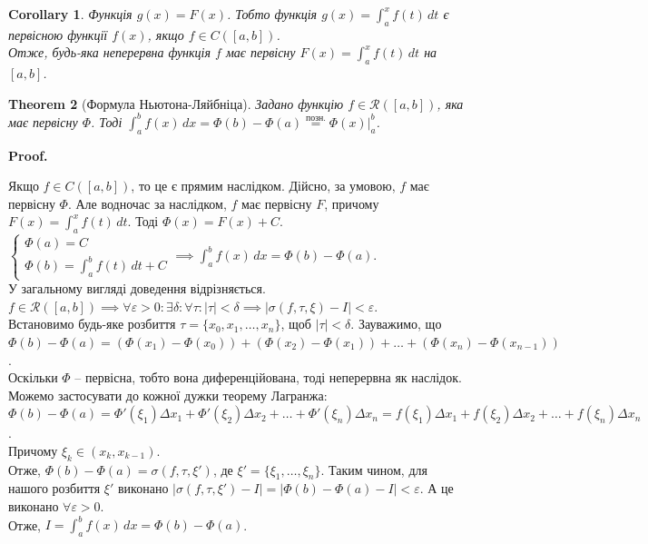 \documentclass[a4paper, 10pt]{article}
\makeatletter
\def\huge{\displaystyle}
\theoremstyle{theoremdd}
\newtheorem{theorem}{Theorem}[subsection]
\theoremstyle{theoremdd}
\theoremstyle{theoremdd}
\theoremstyle{theoremdd}
\theoremstyle{theoremdd}
\theoremstyle{theoremdd}
\theoremstyle{theoremdd}
\theoremstyle{theoremdd}
\theoremstyle{theoremdd}
\newtheorem{corollary}[theorem]{Corollary}
\renewenvironment{proof}[1][Proof.\\]{\par
\pushQED{\hfill \qed}%
\normalfont \topsep6\p@\@plus6\p@\relax
\trivlist
\item\relax
{\bfseries
#1\@addpunct{.}}\hspace\labelsep\ignorespaces
}{%
\popQED\endtrivlist\@endpefalse
}
\makeatother
\begin{document}
\begin{corollary}
Функція $g(x) = F(x)$. Тобто функція $g(x) = \huge\int_a^x f(t)\,dt$ є первісною функції $f(x)$, якщо $f \in C([a,b])$.\\
Отже, будь-яка неперервна функція $f$ має первісну $F(x) = \huge\int_a^x f(t)\,dt$ на $[a,b]$.
\end{corollary}

\begin{theorem}[Формула Ньютона-Ляйбніца]
Задано функцію $f \in \mathcal{R}([a,b])$, яка має первісну $\Phi$. Тоді $\huge\int_a^b f(x)\,dx = \Phi(b) - \Phi(a) \overset{\text{позн.}}{=} \Phi(x)\Big|_a^b$.
\end{theorem}

\begin{proof}
Якщо $f \in C([a,b])$, то це є прямим наслідком. Дійсно, за умовою, $f$ має первісну $\Phi$. Але водночас за наслідком, $f$ має первісну $F$, причому $F(x) = \huge\int_a^x f(t)\,dt$. Тоді $\Phi(x) = F(x) + C$.\\
$\begin{cases}
\Phi(a) = C \\
\Phi(b) = \huge\int_a^b f(t)\,dt + C
\end{cases} \implies \huge\int_a^b f(x)\,dx = \Phi(b) - \Phi(a)$.
\bigskip \\
У загальному вигляді доведення відрізняється. \\
$f \in \mathcal{R}([a,b]) \implies \forall \varepsilon > 0: \exists \delta: \forall \tau: |\tau| < \delta \implies |\sigma(f, \tau, \xi)-I|<\varepsilon$.\\
Встановимо будь-яке розбиття $\tau = \{x_0,x_1,\dots,x_n\}$, щоб $|\tau| < \delta$. Зауважимо, що\\
$\Phi(b) - \Phi(a) = (\Phi(x_1)-\Phi(x_0)) + (\Phi(x_2)-\Phi(x_1)) + \dots + (\Phi(x_n)-\Phi(x_{n-1}))$.\\
Оскільки $\Phi$ -- первісна, тобто вона диференційована, тоді неперервна як наслідок. Можемо застосувати до кожної дужки теорему Лагранжа:\\
$\Phi(b) - \Phi(a) = \Phi'(\xi_1) \Delta x_1 + \Phi'(\xi_2) \Delta x_2 + \dots + \Phi'(\xi_n)\Delta x_n = f(\xi_1)\Delta x_1 + f(\xi_2)\Delta x_2 + \dots + f(\xi_n)\Delta x_n$.\\
Причому $\xi_k \in (x_k,x_{k-1})$.\\
Отже, $\Phi(b) - \Phi(a) = \sigma(f,\tau,\xi')$, де $\xi' = \{\xi_1,\dots,\xi_n\}$. Таким чином, для нашого розбиття $\xi'$ виконано $|\sigma(f,\tau,\xi') - I| = |\Phi(b) - \Phi(a) - I| <\varepsilon$. А це виконано $\forall \varepsilon > 0$.\\
Отже, $I = \huge\int_a^b f(x)\,dx = \Phi(b) - \Phi(a)$.
\end{proof}
\end{document}
